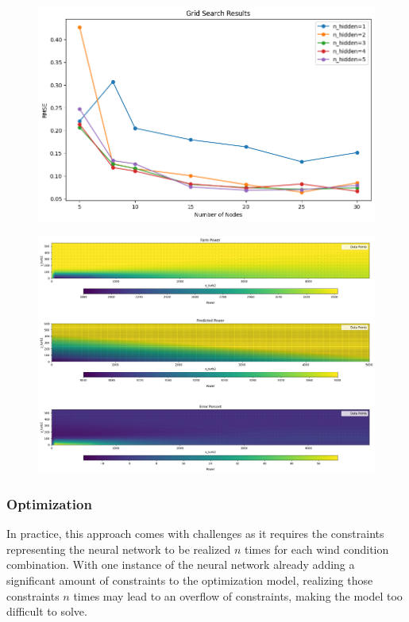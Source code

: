 \begin{figure}[h] 
	\centering
	\includegraphics[width=1\textwidth]{figures/optimization/determ_nn_opti.png} 
	\caption{}
	\label{fig:determ_nn_opti}
\end{figure}

\begin{figure}[h] 
	\centering
	\includegraphics[width=1\textwidth]{figures/optimization/determ_model_colormap.png} 
	\caption{}
	\label{fig:determ_model_colormap}
\end{figure}


\subsubsection{Optimization}


In practice, this approach comes with challenges as it requires the constraints representing the neural network to be realized $n$ times for each wind condition combination. With one instance of the neural network already adding a significant amount of constraints to the optimization model, realizing those constraints $n$ times may lead to an overflow of constraints, making the model too difficult to solve.
	


